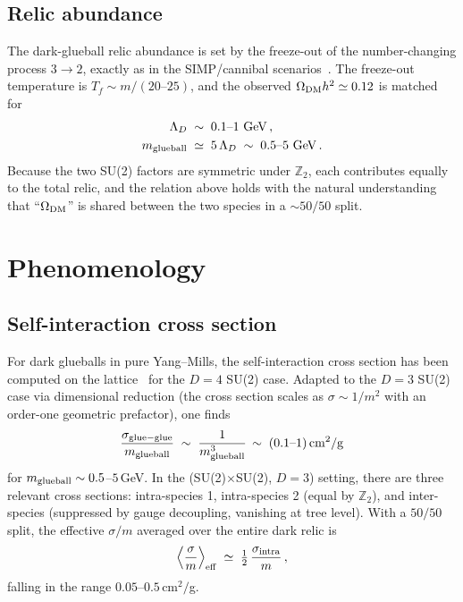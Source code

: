 \documentclass[aps,prd,twocolumn,nofootinbib,superscriptaddress,floatfix]{revtex4-2}
\begin{document}
\subsection{Relic abundance}
The dark-glueball relic abundance is set by the freeze-out of the number-changing process $3\to 2$, exactly as in the SIMP/cannibal scenarios~\cite{Carlson1992,Hochberg2014}. The freeze-out temperature is $T_f\sim m/(20\text{--}25)$, and the observed $\Omega_{\rm DM}h^2\simeq 0.12$ is matched for~\cite{FMS2016}
\begin{align}
    \Lambda_D &\;\sim\; 0.1\text{--}1\,\,{\rm GeV}\,,\\
    m_{\rm glueball} &\;\simeq\;5\,\Lambda_D\;\sim\;0.5\text{--}5\,\,{\rm GeV}\,.
\end{align}
Because the two SU(2) factors are symmetric under $\mathbb{Z}_2$, each contributes equally to the total relic, and the relation above holds with the natural understanding that ``$\Omega_{\rm DM}$'' is shared between the two species in a $\sim 50/50$ split.

\section{Phenomenology}
\label{sec:pheno}

\subsection{Self-interaction cross section}
For dark glueballs in pure Yang--Mills, the self-interaction cross section has been computed on the lattice~\cite{Yamanaka2019} for the $D=4$ SU(2) case. Adapted to the $D=3$ SU(2) case via dimensional reduction (the cross section scales as $\sigma \sim 1/m^2$ with an order-one geometric prefactor), one finds
\begin{equation}
    \frac{\sigma_{\rm glue-glue}}{m_{\rm glueball}} \;\sim\; \frac{1}{m_{\rm glueball}^3}\,\sim\; (0.1\text{--}1)\,{\rm cm}^2/{\rm g}
\end{equation}
for $m_{\rm glueball}\sim 0.5$--$5\,$GeV. In the (SU(2)$\times$SU(2), $D=3$) setting, there are three relevant cross sections: intra-species 1, intra-species 2 (equal by $\mathbb{Z}_2$), and inter-species (suppressed by gauge decoupling, vanishing at tree level). With a $50/50$ split, the effective $\sigma/m$ averaged over the entire dark relic is
\begin{equation}
    \Bigl\langle\frac{\sigma}{m}\Bigr\rangle_{\rm eff} \;\simeq\; \tfrac{1}{2}\,\frac{\sigma_{\rm intra}}{m}\,,
\end{equation}
falling in the range $0.05$--$0.5\,$cm$^2/$g.
\end{document}
